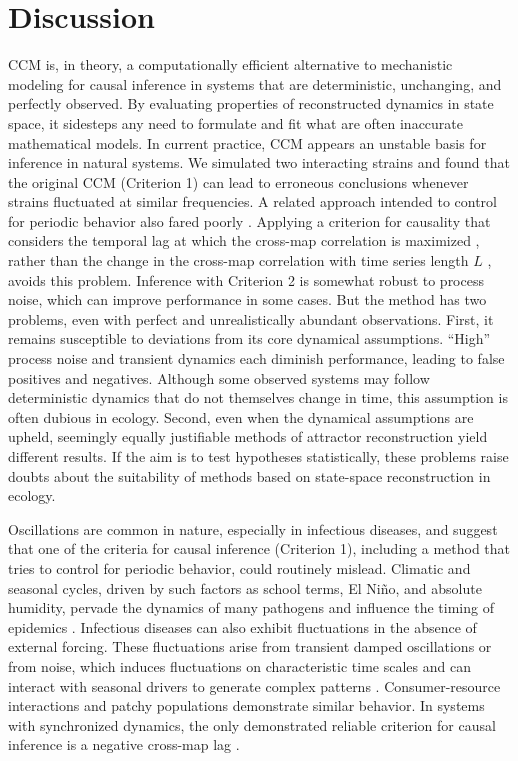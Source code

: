 \documentclass[10pt,letterpaper]{article}
\begin{document}
\section*{Discussion}
CCM is, in theory, a computationally efficient alternative to mechanistic modeling for causal inference in systems that are deterministic, unchanging, and perfectly observed.
By evaluating properties of reconstructed dynamics in state space, it sidesteps any need to formulate and fit what are often inaccurate mathematical models.
In current practice, CCM appears an unstable basis for inference in natural systems.
We simulated two interacting strains and found that the original CCM (Criterion 1) can lead to erroneous conclusions whenever strains fluctuated at similar frequencies.
A related approach intended to control for periodic behavior also fared poorly \cite{Deyle2016b}.
Applying a criterion for causality that considers the temporal lag at which the cross-map correlation is maximized \cite{Ye2015}, rather than the change in the cross-map correlation with time series length $L$ \cite{Sugihara2012}, avoids this problem.
Inference with Criterion 2 is somewhat robust to process noise, which can improve performance in some cases.
But the method has two problems, even with perfect and unrealistically abundant observations.
First, it remains susceptible to deviations from its core dynamical assumptions. 
``High'' process noise and transient dynamics each diminish performance, leading to false positives and negatives.
Although some observed systems may follow deterministic dynamics that do not themselves change in time, this assumption is often dubious in ecology.
Second, even when the dynamical assumptions are upheld, seemingly equally justifiable methods of attractor reconstruction yield different results.
If the aim is to test hypotheses statistically, these problems raise doubts about the suitability of methods based on state-space reconstruction in ecology.

Oscillations are common in nature, especially in infectious diseases, and suggest that one of the criteria for causal inference (Criterion 1), including a method that tries to control for periodic behavior, could routinely mislead.
Climatic and seasonal cycles, driven by such factors as school terms, El Ni{\~{n}}o, and absolute humidity, pervade the dynamics of many pathogens and influence the timing of epidemics \cite{Shaman2010, Laneri2010, Finkenstadt2000, Altizer2006, Metcalf2009}. 
Infectious diseases can also exhibit fluctuations in the absence of external forcing.
These fluctuations arise from transient damped oscillations or from noise, which induces fluctuations on characteristic time scales and can interact with seasonal drivers to generate complex patterns \cite{Alonso2006, Nguyen2008, Rand1991, Rohani2002}.
Consumer-resource interactions \cite{Boland2009, McKane2005, Turchin2003} and patchy populations \cite{Nisbet1978, Durrett1994} demonstrate similar behavior.
In systems with synchronized dynamics, the only demonstrated reliable criterion for causal inference is a negative cross-map lag \cite{Ye2015}.
\end{document}
